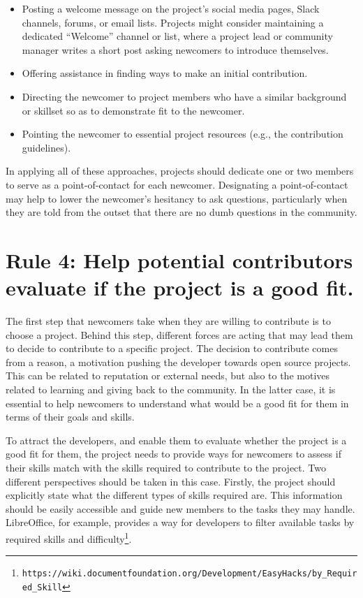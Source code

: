 \documentclass[10pt,letterpaper]{article}
\newcommand{\rulemajor}[1]{\section{#1}}
\newcommand{\withurl}[2]{{#1}\footnote{{\texttt{#2}}}}
\begin{document}
\begin{itemize}

\item
  Posting a welcome message on the project's social media pages, Slack channels, forums, or email lists.
  Projects might consider maintaining a dedicated ``Welcome'' channel or list,
  where a project lead or community manager writes a short post asking newcomers to introduce themselves.

\item
  Offering assistance in finding ways to make an initial contribution.

\item
  Directing the newcomer to project members who have a similar background or skillset
  so as to demonstrate fit to the newcomer.

\item
  Pointing the newcomer to essential project resources (e.g., the contribution guidelines).

\end{itemize}

In applying all of these approaches,
projects should dedicate one or two members to serve as a point-of-contact for each newcomer.
Designating a point-of-contact may help to lower the newcomer's hesitancy to ask questions,
particularly when they are told from the outset that there are no dumb questions in the community.

\rulemajor{Rule 4: Help potential contributors evaluate if the project is a good fit.}

The first step that newcomers take when they are willing to contribute is to choose a project.
Behind this step,
different forces are acting that may lead them to decide to contribute to a specific project.
The decision to contribute comes from a reason,
a motivation pushing the developer towards open source projects.
This can be related to reputation or external needs,
but also to the motives related to learning and giving back to the community.
In the latter case,
it is essential to help newcomers to understand what would be a good fit for them in terms of their goals and skills.

To attract the developers,
and enable them to evaluate whether the project is a good fit for them,
the project needs to provide ways for newcomers to assess if their skills match with the skills required to contribute to the project.
Two different perspectives should be taken in this case.
Firstly,
the project should explicitly state what the different types of skills required are.
This information should be easily accessible and guide new members to the tasks they may handle.
LibreOffice,
for example,
provides a way for developers to filter available tasks by
\withurl{required skills and difficulty}{https://wiki.documentfoundation.org/Development/EasyHacks/by\_Required\_Skill}.
\end{document}
